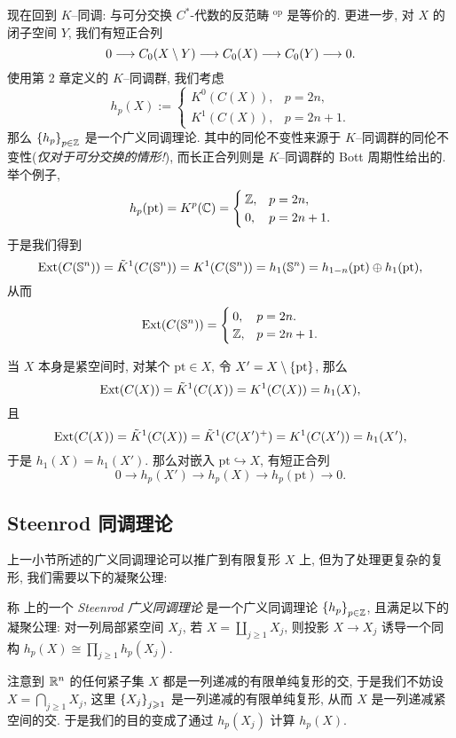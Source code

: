 现在回到 $ K $--同调:  与可分交换 $ C^* $-代数的反范畴 $ ^\text{op} $ 是等价的. 更进一步, 对 $ X $ 的闭子空间 $ Y $, 我们有短正合列
\[
	0\longrightarrow C_0(X\setminus Y)\longrightarrow C_0(X)\longrightarrow C_0(Y)\longrightarrow 0.
\]
使用第 2 章定义的 $ K $--同调群, 我们考虑
\[
	h_p(X):=\begin{cases}
		K^0(C(X)), & p=2n, \\ K^1(C(X)), & p=2n+1.
	\end{cases}
\]
那么 $ \left\{ h_p \right\}_{p\in\mathbb{Z}} $ 是一个广义同调理论. 其中的同伦不变性来源于 $ K $--同调群的同伦不变性(\textit{仅对于可分交换的情形!}), 而长正合列则是 $ K $--同调群的 Bott 周期性给出的. 举个例子,
\[
	h_p(\mathrm{pt})=K^p(\mathbb{C})=\begin{cases}
		\mathbb{Z}, & p=2n, \\ 0, & p=2n+1.
	\end{cases}
\]
于是我们得到
\[
	\mathrm{Ext}(C(\mathbb{S}^n))=\tilde{K}^1(C(\mathbb{S}^n))=K^1(C(\mathbb{S}^n))=h_1(\mathbb{S}^n)=h_{1-n}(\mathrm{pt})\oplus h_1(\mathrm{pt}),
\]
从而
\[
	\mathrm{Ext}(C(\mathbb{S}^n))=\begin{cases}
		0, & p=2n. \\ \mathbb{Z}, & p=2n+1.
	\end{cases}
\]

当 $ X $ 本身是紧空间时, 对某个 $ \mathrm{pt}\in X $, 令 $ X'=X\setminus\left\{ \mathrm{pt} \right\} $, 那么
\[
	\mathrm{Ext}(C(X))=\tilde{K}^1(C(X))=K^1(C(X))=h_1(X),
\]
且
\[
	\mathrm{Ext}(C(X))=\tilde{K}^1(C(X))=\tilde{K}^1(C(X')^+)=K^1(C(X'))=h_1(X'),
\]
于是 $ h_1(X)=h_1(X') $. 那么对嵌入 $ \mathrm{pt}\hookrightarrow X $, 有短正合列
\[
	0\longrightarrow h_p(X')\longrightarrow h_p(X)\longrightarrow h_p(\mathrm{pt})\longrightarrow 0.
\]

\subsection{Steenrod 同调理论}

上一小节所述的广义同调理论可以推广到有限复形 $ X $ 上, 但为了处理更复杂的复形, 我们需要以下的凝聚公理:

\begin{Definition}
	称  上的一个 \emph{Steenrod 广义同调理论} 是一个广义同调理论 $ \left\{ h_p \right\}_{p\in\mathbb{Z}} $, 且满足以下的凝聚公理: 对一列局部紧空间 $ X_j $, 若 $ X=\coprod_{j\geqslant 1}X_j $, 则投影 $ X\to X_j $ 诱导一个同构 $ h_p(X)\cong\prod_{j\geqslant 1}h_p(X_j) $.
\end{Definition}

注意到 $ \mathbb{R}^n $ 的任何紧子集 $ X $ 都是一列递减的有限单纯复形的交, 于是我们不妨设 $ X=\bigcap_{j\geqslant 1}X_j $, 这里 $ \left\{ X_j \right\}_{j\geqslant 1} $ 是一列递减的有限单纯复形, 从而 $ X $ 是一列递减紧空间的交. 于是我们的目的变成了通过 $ h_p(X_j) $ 计算 $ h_p(X) $.

